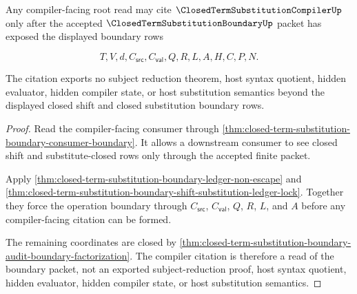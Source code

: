 \begin{theorem}
\label{thm:closed-term-substitution-boundary-root-compiler-nonescape}
Any compiler-facing root read may cite $\ClosedTermSubstitutionCompilerUp$ only after the accepted $\ClosedTermSubstitutionBoundaryUp$ packet has exposed the displayed boundary rows

$$
T,V,d,C_{\mathsf{src}},C_{\mathsf{val}},Q,R,L,A,H,C,P,N.
$$

The citation exports no subject reduction theorem, host syntax quotient, hidden evaluator, hidden compiler state, or host substitution semantics beyond the displayed closed shift and closed substitution boundary rows.
\end{theorem}
\begin{proof}
Read the compiler-facing consumer through \autoref{thm:closed-term-substitution-boundary-consumer-boundary}. It allows a downstream consumer to see closed shift and substitute-closed rows only through the accepted finite packet.

Apply \autoref{thm:closed-term-substitution-boundary-ledger-non-escape} and \autoref{thm:closed-term-substitution-boundary-shift-substitution-ledger-lock}. Together they force the operation boundary through $C_{\mathsf{src}}$, $C_{\mathsf{val}}$, $Q$, $R$, $L$, and $A$ before any compiler-facing citation can be formed.

The remaining coordinates are closed by \autoref{thm:closed-term-substitution-boundary-audit-boundary-factorization}. The compiler citation is therefore a read of the boundary packet, not an exported subject-reduction proof, host syntax quotient, hidden evaluator, hidden compiler state, or host substitution semantics.
\end{proof}

